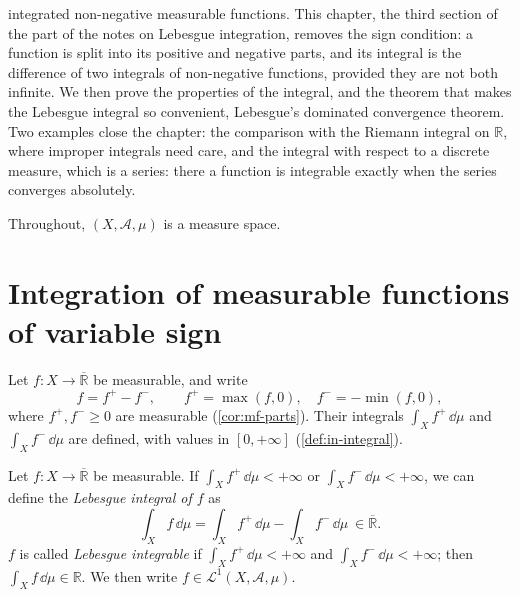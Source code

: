 
 integrated non-negative measurable functions. This chapter, the third
section of the part of the notes on Lebesgue integration, removes the sign condition: a
function is split into its positive and negative parts, and its integral is the difference of
two integrals of non-negative functions, provided they are not both infinite. We then prove
the properties of the integral, and the theorem that makes the Lebesgue integral so
convenient, Lebesgue's dominated convergence theorem. Two examples close the chapter: the
comparison with the Riemann integral on $\mathbb R$, where improper integrals need care, and
the integral with respect to a discrete measure, which is a series: there a function is
integrable exactly when the series converges absolutely.

Throughout, $(X,\mathcal A,\mu)$ is a measure space.

\section{Integration of measurable functions of variable sign}\label{sec:ig-signed}

Let $f:X\to\overline{\mathbb R}$ be measurable, and write
\[
  f=f^+-f^-,\qquad f^+=\max(f,0),\quad f^-=-\min(f,0),
\]
where $f^+,f^-\ge0$ are measurable (\cref{cor:mf-parts}). Their integrals
$\int_Xf^+\,\dd\mu$ and $\int_Xf^-\,\dd\mu$ are defined, with values in $[0,+\infty]$
(\cref{def:in-integral}).

\begin{definition}\label{def:ig-integrable}
Let $f:X\to\overline{\mathbb R}$ be measurable. If $\int_Xf^+\,\dd\mu<+\infty$ or
$\int_Xf^-\,\dd\mu<+\infty$, we can define the \emph{Lebesgue integral of $f$} as
\[
  \int_Xf\,\dd\mu=\int_Xf^+\,\dd\mu-\int_Xf^-\,\dd\mu\ \in\overline{\mathbb R}.
\]
$f$ is called \emph{Lebesgue integrable} if $\int_Xf^+\,\dd\mu<+\infty$ and
$\int_Xf^-\,\dd\mu<+\infty$; then $\int_Xf\,\dd\mu\in\mathbb R$. We then write
$f\in\mathcal L^1(X,\mathcal A,\mu)$.
\end{definition}

